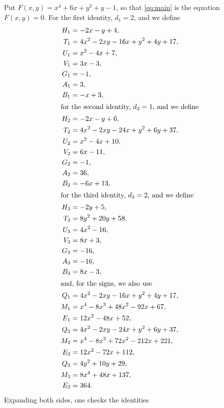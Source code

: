 \documentclass[11pt]{article}
\begin{document}
Put $F(x,y)=x^{4}+6x+y^{3}+y-1$, so that \eqref{eq:main} is the equation $F(x,y)=0$.
For the first identity, $d_{1}=2$, and we define
\begin{align*}
H_{1}&=-2x-y+4,\\
T_{1}&=4x^{2}-2xy-16x+y^{2}+4y+17,\\
U_{1}&=x^{2}-4x+7,\\
V_{1}&=3x-3,\\
G_{1}&=-1,\\
A_{1}&=3,\\
B_{1}&=-x+3,\\
\intertext{for the second identity, $d_{2}=1$, and we define}
H_{2}&=-2x-y+6,\\
T_{2}&=4x^{2}-2xy-24x+y^{2}+6y+37,\\
U_{2}&=x^{2}-4x+10,\\
V_{2}&=6x-11,\\
G_{2}&=-1,\\
A_{2}&=36,\\
B_{2}&=-6x+13,\\
\intertext{for the third identity, $d_{3}=2$, and we define}
H_{3}&=-2y+5,\\
T_{3}&=8y^{2}+20y+58,\\
U_{3}&=4x^{2}-16,\\
V_{3}&=8x+3,\\
G_{3}&=-16,\\
A_{3}&=-16,\\
B_{3}&=8x-3,\\
\intertext{and, for the signs, we also use}
Q_{1}&=4x^{2}-2xy-16x+y^{2}+4y+17,\\
M_{1}&=x^{4}-8x^{3}+48x^{2}-92x+67,\\
E_{1}&=12x^{2}-48x+52,\\
Q_{2}&=4x^{2}-2xy-24x+y^{2}+6y+37,\\
M_{2}&=x^{4}-8x^{3}+72x^{2}-212x+221,\\
E_{2}&=12x^{2}-72x+112,\\
Q_{3}&=4y^{2}+10y+29,\\
M_{3}&=8x^{4}+48x+137,\\
E_{3}&=364.
\end{align*}
Expanding both sides, one checks the identities
\end{document}
